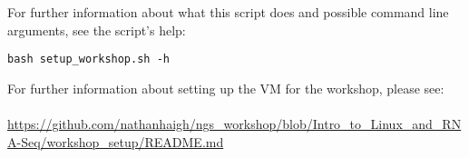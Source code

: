 For further information about what this script does and possible command line
arguments, see the script's help:
\begin{lstlisting}
bash setup_workshop.sh -h
\end{lstlisting}


For further information about setting up the VM for the workshop, please see:
\\\\
\url{https://github.com/nathanhaigh/ngs_workshop/blob/Intro_to_Linux_and_RNA-Seq/workshop_setup/README.md}
